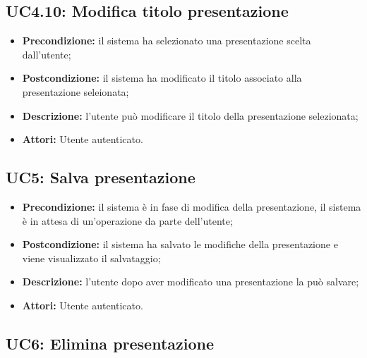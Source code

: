 \subsection{ UC4.10: Modifica titolo presentazione}

\begin{itemize}
	\item \textbf{Precondizione:} il sistema ha selezionato una presentazione scelta dall'utente;
	\item \textbf{Postcondizione:} il sistema ha modificato il titolo associato alla presentazione seleionata;
	\item \textbf{Descrizione:} l'utente può modificare il titolo della presentazione selezionata;
	\item \textbf{Attori:} Utente autenticato.
\end{itemize}
\subsection{ UC5: Salva presentazione}

\begin{itemize}
	\item \textbf{Precondizione:} il sistema è in fase di modifica della presentazione, il sistema è in attesa di un'operazione da parte dell'utente;
	\item \textbf{Postcondizione:} il sistema ha salvato le modifiche della presentazione e viene visualizzato il salvataggio;
	\item \textbf{Descrizione:} l'utente dopo aver modificato una presentazione la può salvare;
	\item \textbf{Attori:} Utente autenticato.
\end{itemize}
\subsection{ UC6: Elimina presentazione}

